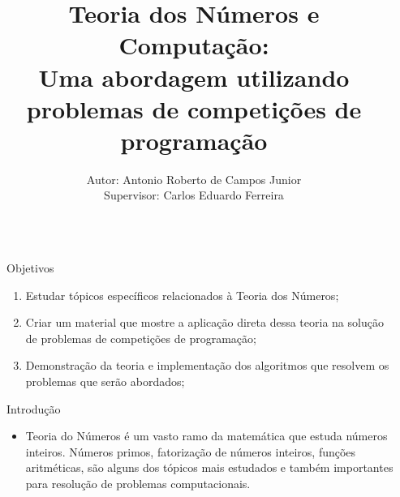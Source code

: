 \documentclass[final,hyperref={pdfpagelabels=false}]{beamer}
\title{\huge Teoria dos Números e Computação: \\ \normalsize Uma abordagem utilizando problemas de competições de programação} %
\author{Autor: Antonio Roberto de Campos Junior \\ Supervisor: Carlos Eduardo Ferreira} %
\institute{Instituto de Matemática e Estatística - Universidade de São Paulo} %
\begin{document}

\begin{frame}[t] %

\begin{columns}[t] %

\begin{column}{.02\textwidth}\end{column} %

\begin{column}{.465\textwidth} %


\begin{block}{Objetivos}

\begin{enumerate}
\item Estudar tópicos específicos relacionados à Teoria dos Números;
\item Criar um material que mostre a aplicação direta dessa teoria na solução de problemas de competições de programação;
\item Demonstração da teoria e implementação dos algoritmos que resolvem os problemas que serão abordados;
\end{enumerate}

\end{block}

            
\begin{block}{Introdução}

\begin{itemize}
\item Teoria do Números é um vasto ramo da matemática que estuda números inteiros. Números primos, fatorização de números inteiros, funções aritméticas, são alguns dos tópicos mais estudados e também importantes para resolução de problemas computacionais.


\end{itemize}
\end{block}
\end{column}
\end{columns}
\end{frame}
\end{document}
